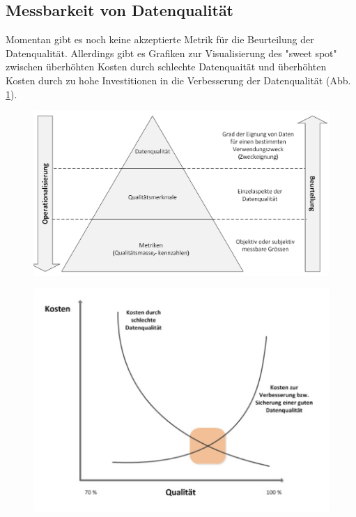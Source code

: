 \documentclass[a4paper, 11pt, nofootinbib]{article}
\begin{document}
\newpage

\subsection{Messbarkeit von Datenqualität}
Momentan gibt es noch keine akzeptierte Metrik für die Beurteilung der Datenqualität. Allerdings gibt es Grafiken zur Visualisierung des "sweet spot" zwischen überhöhten Kosten durch schlechte Datenquaität und überhöhten Kosten durch zu hohe Investitionen in die Verbesserung der Datenqualität (Abb. \ref{fig:costQuality}). 

\begin{figure}[htb!]
\centering
\begin{minipage}{.45\textwidth}
	\centering
	\includegraphics[keepaspectratio=true,height=10\baselineskip]{messungDatenQualitaet.PNG}
	\label{fig:measureQuality}
\end{minipage}
\begin{minipage}{.45\textwidth}
	\centering
	\includegraphics[keepaspectratio=true,height=10\baselineskip]{kostenNutzung.PNG}
	\label{fig:costQuality}
\end{minipage}
\end{figure}
\end{document}
